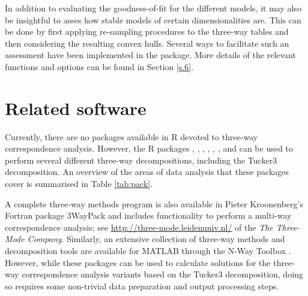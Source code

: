 In addition to evaluating the goodness-of-fit for the different models, it may also be insightful to asses how stable models of certain dimensionalities are. This can be done by first applying re-sampling procedures to the three-way tables and then considering the resulting convex hulls. Several ways to facilitate such an assessment have been implemented in the  package. More details of the relevant functions and options can be found in Section \ref{s.6}.


\section{Related software}
\label{s.5}

Currently, there are no packages available in R devoted to three-way correspondence analysis. However,  the R packages   \citep{lei10},    \citep{gio14},   \citep{li18},  \citep{eil19},  \citep{rev18},  \citep{sta18},  \citep{zho19} and  \citep{hof17} can be used to perform several different three-way decompositions, including the Tucker3 decomposition. An overview of the areas of data analysis that these packages cover is summarised in Table \ref{tab:pack}.

A complete three-way methods program is also available in Pieter Kroonenberg's Fortran package 3WayPack and includes functionality to perform a multi-way correspondence analysis; see  \url{http://three-mode.leidenuniv.nl/} of the  {\it The Three-Mode Company}. Similarly, an extensive collection of three-way methods and decomposition tools are available for MATLAB through the N-Way Toolbox \cite[]{bro2020}. However, while these packages can be used to calculate solutions for the three-way correspondence analysis variants based on the Tucker3 decomposition, doing so requires some non-trivial data preparation and output processing steps.

